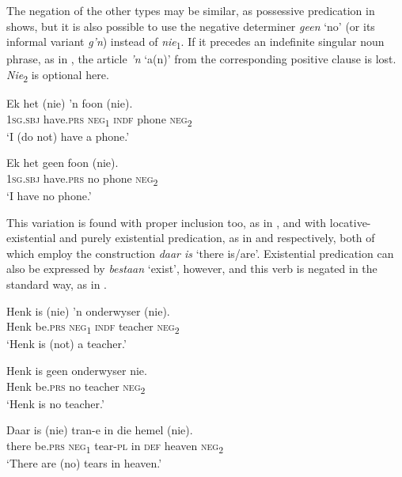 \documentclass[output=paper,colorlinks,citecolor=brown]{langscibook}
\begin{document}
The negation of the other types may be similar, as possessive predication in  shows, but it is also possible to use the negative determiner \textit{geen} ‘no’ (or its informal variant \textit{g’n}) instead of \textit{nie}\textsubscript{1}. If it precedes an indefinite singular noun phrase, as in , the article \textit{’n} ‘a(n)’ from the corresponding positive clause is lost. \textit{Nie}\textsubscript{2} is optional here.

\ea\label{ex:afr:15}
    
    \ea\label{ex:afr:15a}
        \gll Ek het (nie) ’n foon (nie). \\ 
             \textsc{1sg.sbj}  have.\textsc{prs} \textsc{neg}\textsubscript{1} \textsc{indf} phone  \textsc{neg}\textsubscript{2} \\
        \glt ‘I (do not) have a phone.’
    
    \ex\label{ex:afr:15b}
        \gll Ek het geen foon (nie). \\
             \textsc{1sg.sbj} have.\textsc{prs} no phone  \textsc{neg}\textsubscript{2} \\
        \glt ‘I have no phone.’
    \z
\z 
 

This variation is found with proper inclusion too, as in , and with locative-existential and purely existential predication, as in  and  respectively, both of which employ the construction \textit{daar is} ‘there is/are’. Existential predication can also be expressed by \textit{bestaan} ‘exist’, however, and this verb is negated in the standard way, as in .

\ea\label{ex:afr:16}
    \ea\label{ex:afr:16a}
        \gll Henk is (nie) ’n onderwyser (nie). \\ 
             Henk be.\textsc{prs} \textsc{neg}\textsubscript{1} \textsc{indf} teacher      \textsc{neg}\textsubscript{2} \\
        \glt ‘Henk is (not) a teacher.’
    
    \ex\label{ex:afr:16b}
        \gll Henk is geen onderwyser nie. \\
             Henk be.\textsc{prs} no teacher \textsc{neg}\textsubscript{2} \\
        \glt  ‘Henk is no teacher.’
    \z
\z 

\ea\label{ex:afr:17}
    \ea\label{ex:afr:17a}
        \gll Daar is (nie) tran-e in die hemel (nie). \\ 
             there  be.\textsc{prs}  \textsc{neg}\textsubscript{1} tear-\textsc{pl} in  \textsc{def} heaven \textsc{neg}\textsubscript{2} \\
        \glt ‘There are (no) tears in heaven.’
    
\end{document}
